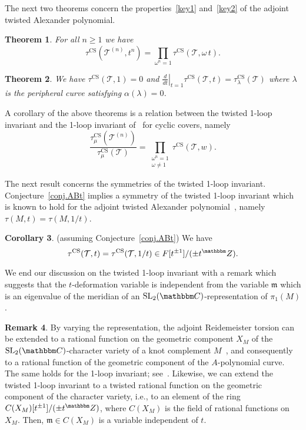 \documentclass[12pt,reqno]{amsart}
\newtheorem{theorem}{Theorem}[section]
\theoremstyle{definition}
\newtheorem{remark}[theorem]{Remark}
\newtheorem{corollary}[theorem]{Corollary}
\def\BZ{\mathbbm Z}
\def\BC{\mathbbm C}
\def\calT{\mathcal T}
\def\SL{\mathrm{SL}}
\def\be{\begin{equation}}
\def\ee{\end{equation}}
\def\CS{\mathrm{CS}}
\begin{document}
The next two theorems concern the properties~\eqref{key1} and~\eqref{key2} of the
adjoint twisted Alexander polynomial.

\begin{theorem}
\label{thm.1}
For all $n \geq 1$ we have
\be
\label{1loopcyclic}
  \tau^{\CS}(\calT^{(n)},t^n)=\prod_{\omega^n=1}\tau^{\CS}(\calT,\omega\, t)  .
\ee
\end{theorem}

\begin{theorem}
\label{thm.2}
We have
$\tau^\CS(\calT,1)=0$ and $ \left. \frac{d}{dt}\right|_{t=1}
\tau^{\CS}(\calT,t) = \tau_\lambda^{\CS}(\calT)$
where $\lambda$ is the peripheral curve satisfying $\alpha(\lambda)=0$.
\end{theorem}

A corollary of the above theorems is a relation between the twisted 1-loop invariant
and the 1-loop invariant of~\cite{DG1} for cyclic covers, namely
\be
\label{behavior2}
\frac{\tau^\CS_\mu(\calT^{(n)})}{\tau^\CS_\mu(\calT)}
=   \prod_{ \substack{\omega^n=1 \\ \omega \neq 1}} \tau^\CS(\calT,w)  .
\ee

The next result concerns the symmetries of the twisted 1-loop invariant.
Conjecture~\ref{conj.ABt} implies a symmetry of the twisted 1-loop invariant which is
known to hold for the adjoint twisted Alexander polynomial~\cite{Kitano96,KL99},
namely $\tau(M,t)=\tau(M,1/t)$. 

\begin{corollary}(assuming Conjecture~\ref{conj.ABt})
\label{cor.sym}
We have
\be
\label{1loopsymm}
\tau^\CS(\calT,t) = \tau^\CS(\calT,1/t) \in F[t^{\pm1}]/(\pm t^\BZ)  . 
\ee
\end{corollary}

We end our discussion on the twisted 1-loop invariant with a remark which suggests
that the $t$-deformation variable is independent from the variable $\mathfrak{m}$
which is an eigenvalue of the meridian of an $\SL_2(\BC)$-representation of $\pi_1(M)$. 

\begin{remark}
\label{rem.tcharacter}  
By varying the representation, the adjoint Reidemeister torsion can be extended to
a rational function on the geometric component $X_M$ of the $\SL_2(\BC)$-character
variety of a knot complement $M$~\cite{Dubois-Garoufalidis}, and consequently
to a rational function of the geometric component of the $A$-polynomial curve.
The same holds for the 1-loop invariant; see~\cite[Sec.4]{DG1}. Likewise, we can
extend the twisted 1-loop invariant to a twisted rational function on the geometric
component of the character variety, i.e., to an element of the ring
$C(X_M)[t^{\pm1}]/(\pm t^\BZ)$, where $C(X_M)$ is the field of rational functions on
$X_M$. Then, $\mathfrak{m} \in C(X_M)$ is a variable independent of $t$.
\end{remark}
\end{document}
